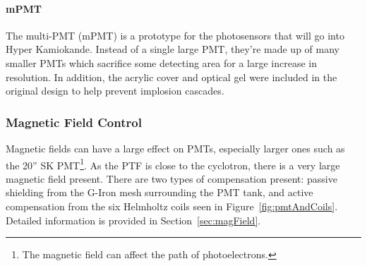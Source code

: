 \documentclass[twoside,letterpaper]{refart}
\begin{document}

\paragraph{mPMT}

The multi-PMT (mPMT) is a prototype for the photosensors that will go into Hyper Kamiokande. Instead of a single large PMT, they're made up of many smaller PMTs which sacrifice some detecting area for a large increase in resolution. In addition, the acrylic cover and optical gel were included in the original design to help prevent implosion cascades.


\subsubsection{Magnetic Field Control}

Magnetic fields can have a large effect on PMTs, especially larger ones such as the 20'' SK PMT\footnote{The magnetic field can affect the path of photoelectrons.}. As the PTF is close to the cyclotron, there is a very large magnetic field present. There are two types of compensation present: passive shielding from the G-Iron mesh surrounding the PMT tank, and active compensation from the six Helmholtz coils seen in Figure~\ref{fig:pmtAndCoils}. Detailed information is provided in Section~\ref{sec:magField}.


\end{document}
